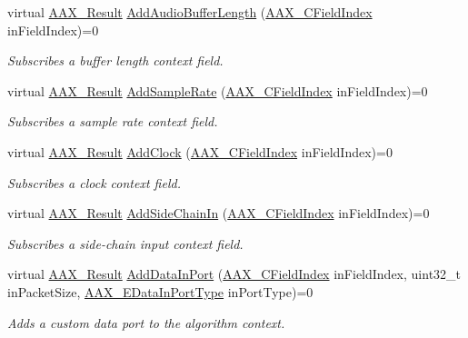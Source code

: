 \begin{DoxyCompactItemize}
virtual \hyperlink{a00149_a4d8f69a697df7f70c3a8e9b8ee130d2f}{A\+A\+X\+\_\+\+Result} \hyperlink{a00050_a38c2683ca133ca0863e4645afd27ab9f}{Add\+Audio\+Buffer\+Length} (\hyperlink{a00149_ae807f8986143820cfb5d6da32165c9c7}{A\+A\+X\+\_\+\+C\+Field\+Index} in\+Field\+Index)=0
\begin{DoxyCompactList}\small\item\em Subscribes a buffer length context field. \end{DoxyCompactList}\item 
virtual \hyperlink{a00149_a4d8f69a697df7f70c3a8e9b8ee130d2f}{A\+A\+X\+\_\+\+Result} \hyperlink{a00050_aa59e93b261ae1f4951ed84b55b70742e}{Add\+Sample\+Rate} (\hyperlink{a00149_ae807f8986143820cfb5d6da32165c9c7}{A\+A\+X\+\_\+\+C\+Field\+Index} in\+Field\+Index)=0
\begin{DoxyCompactList}\small\item\em Subscribes a sample rate context field. \end{DoxyCompactList}\item 
virtual \hyperlink{a00149_a4d8f69a697df7f70c3a8e9b8ee130d2f}{A\+A\+X\+\_\+\+Result} \hyperlink{a00050_af9864953ec953720b844e9ad57a2da14}{Add\+Clock} (\hyperlink{a00149_ae807f8986143820cfb5d6da32165c9c7}{A\+A\+X\+\_\+\+C\+Field\+Index} in\+Field\+Index)=0
\begin{DoxyCompactList}\small\item\em Subscribes a clock context field. \end{DoxyCompactList}\item 
virtual \hyperlink{a00149_a4d8f69a697df7f70c3a8e9b8ee130d2f}{A\+A\+X\+\_\+\+Result} \hyperlink{a00050_ac88f0100827278c2f9bfae2f74ae103f}{Add\+Side\+Chain\+In} (\hyperlink{a00149_ae807f8986143820cfb5d6da32165c9c7}{A\+A\+X\+\_\+\+C\+Field\+Index} in\+Field\+Index)=0
\begin{DoxyCompactList}\small\item\em Subscribes a side-\/chain input context field. \end{DoxyCompactList}\item 
virtual \hyperlink{a00149_a4d8f69a697df7f70c3a8e9b8ee130d2f}{A\+A\+X\+\_\+\+Result} \hyperlink{a00050_af15ea360a7e581ac796b95b473057dad}{Add\+Data\+In\+Port} (\hyperlink{a00149_ae807f8986143820cfb5d6da32165c9c7}{A\+A\+X\+\_\+\+C\+Field\+Index} in\+Field\+Index, uint32\+\_\+t in\+Packet\+Size, \hyperlink{a00206_ab5677b173ad8647c24d34d28272d11fc}{A\+A\+X\+\_\+\+E\+Data\+In\+Port\+Type} in\+Port\+Type)=0
\begin{DoxyCompactList}\small\item\em Adds a custom data port to the algorithm context. \end{DoxyCompactList}\item 

\end{DoxyCompactItemize}
